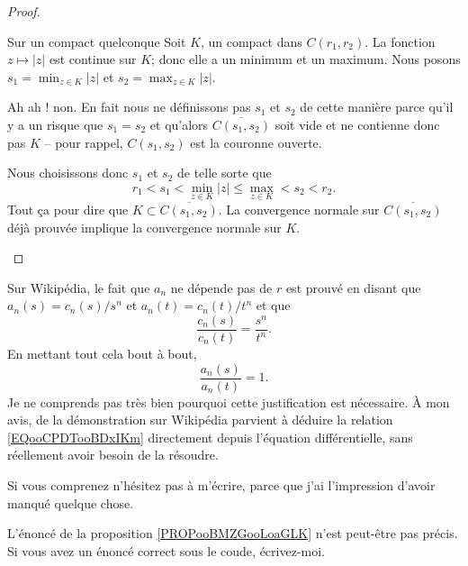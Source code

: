 \begin{proof}
\begin{subproof}
\begin{subproof}
			\item[Sur un compact quelconque]
			Soit \( K\), un compact dans \( C(r_1,r_2)\). La fonction \( z\mapsto | z |\) est continue sur \( K\); donc elle a un minimum et un maximum. Nous posons \( s_1=\min_{z\in K}| z |\) et \( s_2=\max_{z\in K}| z |\).

			Ah ah ! non. En fait nous ne définissons pas \( s_1\) et \( s_2\) de cette manière parce qu'il y a un risque que \( s_1=s_2\) et qu'alors \( \overline{ C(s_1,s_2) }\) soit vide et ne contienne donc pas \( K\) -- pour rappel, \( C(s_1,s_2)\) est la couronne ouverte.

			Nous choisissons donc \( s_1\) et \( s_2\) de telle sorte que
			\begin{equation}
				r_1 <s_1 <\min_{z\in K}| z |\leq \max_{z\in K} <s_2 <r_2.
			\end{equation}
			Tout ça pour dire que \( K\subset \overline{ C(s_1,s_2) }\). La convergence normale sur \( \overline{ C(s_1,s_2) }\) déjà prouvée implique la convergence normale sur \( K\).
		\end{subproof}
	\end{subproof}
\end{proof}

\begin{probleme}        \label{PROPBooYWDNooMXVPLJ}
	Sur Wikipédia\cite{BIBooUBUAooHyhrlg}, le fait que \( a_n\) ne dépende pas de \( r\) est prouvé en disant que \( a_n(s)=c_n(s)/s^n\) et \( a_n(t)=c_n(t)/t^n\) et que
	\begin{equation}        \label{EQooCPDTooBDxIKm}
		\frac{ c_n(s) }{ c_n(t) }=\frac{ s^n }{ t^n }.
	\end{equation}
	En mettant tout cela bout à bout,
	\begin{equation}
		\frac{ a_n(s) }{ a_n(t) }=1.
	\end{equation}
	Je ne comprends pas très bien pourquoi cette justification est nécessaire. À mon avis,  de la démonstration sur Wikipédia parvient à déduire la relation \eqref{EQooCPDTooBDxIKm} directement depuis l'équation différentielle, sans réellement avoir besoin de la résoudre.

	Si vous comprenez n'hésitez pas à m'écrire, parce que j'ai l'impression d'avoir manqué quelque chose.
\end{probleme}

\begin{probleme}
	L'énoncé de la proposition \ref{PROPooBMZGooLoaGLK} n'est peut-être pas précis. Si vous avez un énoncé correct sous le coude, écrivez-moi.
\end{probleme}

